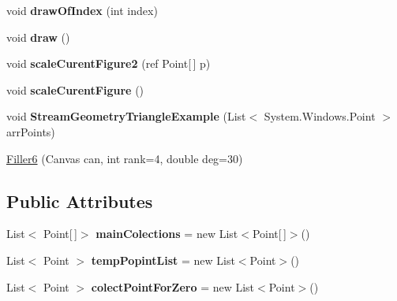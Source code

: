 \begin{DoxyCompactItemize}
\item 
\hypertarget{classtwelve_1_1_filler6_a0c312517f962aa708a0662470476b0d5}{}void {\bfseries draw\+Of\+Index} (int index)\label{classtwelve_1_1_filler6_a0c312517f962aa708a0662470476b0d5}

\item 
\hypertarget{classtwelve_1_1_filler6_af0f697fe0039b2f9d1886e7798621503}{}void {\bfseries draw} ()\label{classtwelve_1_1_filler6_af0f697fe0039b2f9d1886e7798621503}

\item 
\hypertarget{classtwelve_1_1_filler6_a4cac0fa6ebf8c9ab69e812d4c0842a5c}{}void {\bfseries scale\+Curent\+Figure2} (ref Point\mbox{[}$\,$\mbox{]} p)\label{classtwelve_1_1_filler6_a4cac0fa6ebf8c9ab69e812d4c0842a5c}

\item 
\hypertarget{classtwelve_1_1_filler6_a84243055aa0412190507caefc70f10b2}{}void {\bfseries scale\+Curent\+Figure} ()\label{classtwelve_1_1_filler6_a84243055aa0412190507caefc70f10b2}

\item 
\hypertarget{classtwelve_1_1_filler6_a8189c4900c689a1bdfb00d9d89ebabb1}{}void {\bfseries Stream\+Geometry\+Triangle\+Example} (List$<$ System.\+Windows.\+Point $>$ arr\+Points)\label{classtwelve_1_1_filler6_a8189c4900c689a1bdfb00d9d89ebabb1}

\item 
\hyperlink{classtwelve_1_1_filler6_afb5bcc7ec2b0f39501fe2442a34ae0ce}{Filler6} (Canvas can, int rank=4, double deg=30)
\end{DoxyCompactItemize}
\subsection*{Public Attributes}
\begin{DoxyCompactItemize}
\item 
\hypertarget{classtwelve_1_1_filler6_a17bc3075b5dbbe55f0e0275912043bcc}{}List$<$ Point\mbox{[}$\,$\mbox{]}$>$ {\bfseries main\+Colections} = new List$<$Point\mbox{[}$\,$\mbox{]}$>$()\label{classtwelve_1_1_filler6_a17bc3075b5dbbe55f0e0275912043bcc}

\item 
\hypertarget{classtwelve_1_1_filler6_a4bc8a80db9edc1c66efd79b1f30f785c}{}List$<$ Point $>$ {\bfseries temp\+Popint\+List} = new List$<$Point$>$()\label{classtwelve_1_1_filler6_a4bc8a80db9edc1c66efd79b1f30f785c}

\item 
\hypertarget{classtwelve_1_1_filler6_a813212083a003c7229ac49d9da67a92b}{}List$<$ Point $>$ {\bfseries colect\+Point\+For\+Zero} = new List$<$Point$>$()\label{classtwelve_1_1_filler6_a813212083a003c7229ac49d9da67a92b}

\end{DoxyCompactItemize}


